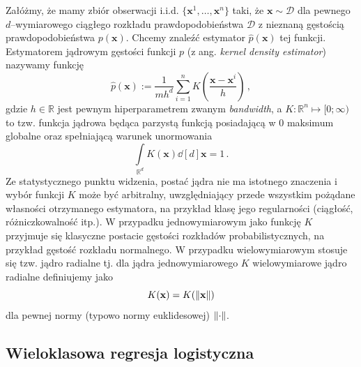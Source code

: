 \documentclass{myclass}
\numberwithin{equation}{section}
\begin{document}
Załóżmy, że mamy zbiór obserwacji i.i.d. \(\{\mathbf{x}^1, \ldots, \mathbf{x}^n\}\) taki, że
\(\mathbf{x} \sim \mathcal{D}\) dla pewnego \(d\)--wymiarowego ciągłego rozkładu
prawdopodobieństwa \(\mathcal{D}\) z nieznaną gęstością prawdopodobieństwa \(p(\mathbf{x})\). Chcemy
znaleźć estymator \(\hat{p}(\mathbf{x})\) tej funkcji. Estymatorem jądrowym gęstości funkcji \(p\)
(z ang. \textit{kernel density estimator}) nazywamy funkcję
\begin{equation}\boxed{
    \hat{p}(\mathbf{x}) := \frac{1}{mh^d}\sum_{i=1}^n K\left(\frac{\mathbf{x} - \mathbf{x}^i}{h}\right)\,,
}\end{equation}
gdzie \(h \in \mathbb{R}\) jest pewnym hiperparametrem zwanym \textit{bandwidth}, a \(K:
\mathbb{R}^n \mapsto [0; \infty)\) to tzw. funkcja jądrowa będąca parzystą funkcją posiadającą w 0
maksimum globalne oraz spełniającą warunek unormowania
\begin{equation}
    \int\limits_{\mathbb{R}^d} K(\mathbf{x}) \dd[d]{\mathbf{x}}= 1\,.
\end{equation}
Ze statystycznego punktu widzenia, postać jądra nie ma istotnego znaczenia i wybór funkcji  \(K\)
może być arbitralny, uwzględniający przede wszystkim pożądane własności otrzymanego estymatora, na
przykład klasę jego regularności (ciągłość, różniczkowalność itp.). W przypadku jednowymiarowym jako
funkcję \(K\) przyjmuje się klasyczne postacie gęstości rozkładów probabilistycznych, na przykład
gęstość rozkładu normalnego. W przypadku wielowymiarowym stosuje się tzw. jądro radialne tj. dla
jądra jednowymiarowego \(K\) wielowymiarowe jądro radialne definiujemy jako
\begin{equation}
    K(\mathbf{x}) = K(\norm{\mathbf{x}})
\end{equation}
dla pewnej normy (typowo normy euklidesowej) \(\norm{\cdot}\).


\subsection{Wieloklasowa regresja logistyczna}
\end{document}
